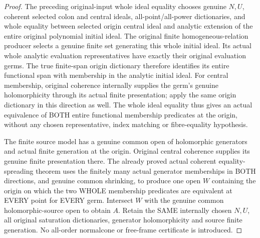 \begin{proof}
The preceding original-input whole ideal equality chooses genuine $N,U$, coherent selected colon and central ideals, all-point/all-power dictionaries, and whole equality between selected origin central ideal and analytic extension of the entire original polynomial initial ideal. The original finite homogeneous-relation producer selects a genuine finite set generating this whole initial ideal. Its actual whole analytic evaluation representatives have exactly their original evaluation germs. The true finite-span origin dictionary therefore identifies its entire functional span with membership in the analytic initial ideal. For central membership, original coherence internally supplies the germ's genuine holomorphicity through its actual finite presentation; apply the same origin dictionary in this direction as well. The whole ideal equality thus gives an actual equivalence of BOTH entire functional membership predicates at the origin, without any chosen representative, index matching or fibre-equality hypothesis.

The finite source model has a genuine common open of holomorphic generators and actual finite generation at the origin. Original central coherence supplies its genuine finite presentation there. The already proved actual coherent equality-spreading theorem uses the finitely many actual generator memberships in BOTH directions, and genuine common shrinking, to produce one open $W$ containing the origin on which the two WHOLE membership predicates are equivalent at EVERY point for EVERY germ. Intersect $W$ with the genuine common holomorphic-source open to obtain $A$. Retain the SAME internally chosen $N,U$, all original saturation dictionaries, generator holomorphicity and source finite generation. No all-order normalcone or free-frame certificate is introduced.
\end{proof}

